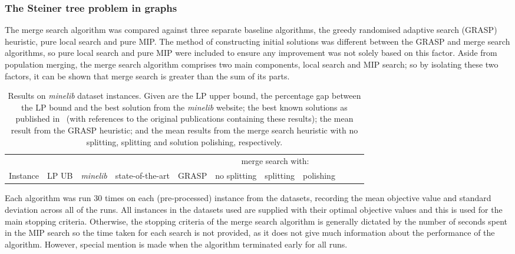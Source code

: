 \documentclass[journal]{IEEEtran}
\begin{document}
\subsubsection*{\textbf{The Steiner tree problem in graphs}}
The merge search algorithm was compared against three separate baseline algorithms, the greedy randomised adaptive search (GRASP) heuristic, pure local search and pure MIP. The method of constructing initial solutions was different between the GRASP and merge search algorithms, so pure local search and pure MIP were included to ensure any improvement was not solely based on this factor. Aside from population merging, the merge search algorithm comprises two main components, local search and MIP search; so by isolating these two factors, it can be shown that merge search is greater than the sum of its parts.

\begin{table}[h]
\centering
\caption[Results on \emph{minelib} dataset instances]{Results on \emph{minelib} dataset instances. Given are the LP upper bound, the percentage gap between the LP bound and the best solution from the \emph{minelib} website; the best known solutions as published in~\cite{minelib-improved} (with references to the original publications containing these results); the mean result from the GRASP heuristic; and the mean results from the merge search heuristic with no splitting, splitting and solution polishing, respectively.
}\label{tab:mine:main}
\begin{adjustbox}{width=0.8\textwidth}
\begin{tabular}{lrrrrrrrrrr} \toprule
 & & & & & \multicolumn{3}{c}{merge search with:}\\
\cmidrule(lr){6-8}
Instance & \multicolumn{1}{c}{LP UB} & \multicolumn{1}{c}{\emph{minelib}} & \multicolumn{1}{c}{state-of-the-art}&\multicolumn{1}{c}{GRASP}&\multicolumn{1}{c}{no splitting} & \multicolumn{1}{c}{splitting}&\multicolumn{1}{c}{polishing}  \\ \midrule
%

%
\bottomrule

\end{tabular}
\end{adjustbox}
\end{table}

Each algorithm was run 30 times on each (pre-processed) instance from the datasets, recording the mean objective value and standard deviation across all of the runs. All instances in the datasets used are supplied with their optimal objective values and this is used for the main stopping criteria. Otherwise, the stopping criteria of the merge search algorithm is generally dictated by the number of seconds spent in the MIP search so the time taken for each search is not provided, as it does not give much information about the performance of the algorithm. However, special mention is made when the algorithm terminated early for all runs.
\end{document}
